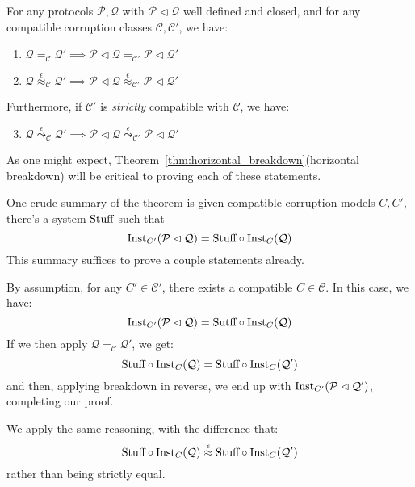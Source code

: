 \begin{theorem}
  For any protocols $\mathcal{P}, \mathcal{Q}$ with $\mathcal{P} \lhd \mathcal{Q}$
  well defined and closed, and for any compatible corruption classes $\mathcal{C}, \mathcal{C'}$, we have:
  \begin{enumerate}
    \item $\mathcal{Q} =_{\mathcal{C}} \mathcal{Q}' \implies \mathcal{P} \lhd \mathcal{Q} =_{\mathcal{C}'} \mathcal{P} \lhd \mathcal{Q}'$
    \item $\mathcal{Q} \overset{\epsilon}{\approx}_{\mathcal{C}} \mathcal{Q}' \implies \mathcal{P} \lhd \mathcal{Q} \overset{\epsilon}{\approx}_{\mathcal{C}'} \mathcal{P} \lhd \mathcal{Q}'$
  \end{enumerate}

  Furthermore, if $\mathcal{C}'$ is \emph{strictly} compatible with $\mathcal{C}$,
  we have:
  \begin{enumerate}
    \setcounter{enumi}{2}
    \item $\mathcal{Q} \overset{\epsilon}{\leadsto}_{\mathcal{C}} \mathcal{Q}' \implies \mathcal{P} \lhd \mathcal{Q} \overset{\epsilon}{\leadsto}_{\mathcal{C}'} \mathcal{P} \lhd \mathcal{Q}'$
  \end{enumerate}

   As one might expect,
  Theorem~\ref{thm:horizontal_breakdown}(horizontal breakdown)
  will be critical to proving each of these statements.

  One crude summary of the theorem is given compatible
  corruption models $C, C'$, there's a system $\text{Stuff}$ such that
  $$
  \text{Inst}_{C'}(\mathcal{P} \lhd \mathcal{Q}) = \text{Stuff} \circ \text{Inst}_C(\mathcal{Q})
  $$
  This summary suffices to prove a couple statements already.

   By assumption, for any $C' \in \mathcal{C}'$,
  there exists a compatible $C \in \mathcal{C}$.
  In this case, we have:
  $$
  \text{Inst}_{C'}(\mathcal{P} \lhd \mathcal{Q}) = \text{Sutff} \circ \text{Inst}_C(\mathcal{Q})
  $$
  If we then apply $\mathcal{Q} =_{\mathcal{C}} \mathcal{Q}'$,
  we get:
  $$
  \text{Stuff} \circ \text{Inst}_C(\mathcal{Q}) = \text{Stuff} \circ \text{Inst}_C(\mathcal{Q}')
  $$
  and then, applying breakdown in reverse, we end up with $\text{Inst}_{C'}(\mathcal{P} \lhd \mathcal{Q}')$,
  completing our proof.

   We apply the same reasoning, with the difference that:
  $$
  \text{Stuff} \circ \text{Inst}_C(\mathcal{Q}) \overset{\epsilon}{\approx} \text{Stuff} \circ \text{Inst}_C(\mathcal{Q}')
  $$
  rather than being strictly equal.


\end{theorem}
